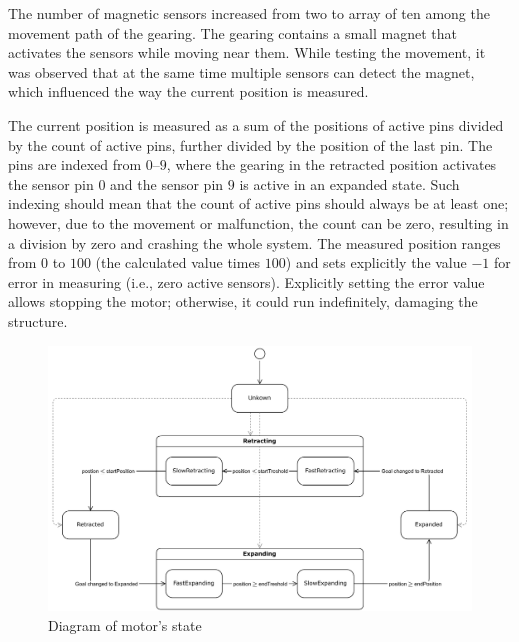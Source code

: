 \documentclass[
  digital,     %
  oneside,     %
  nosansbold,  %
  nocolorbold, %
  nolof,         %
  nolot,         %
]{fithesis4}
\begin{document}
The number of magnetic sensors increased from two to array of ten among the movement path of the
gearing. The gearing contains a small magnet that activates the sensors while moving near them.
While testing the movement, it was observed that at the same time multiple sensors can detect the
magnet, which influenced the way the current position is measured.

The current position is measured as a sum of the positions of active pins divided by the count of
active pins, further divided by the position of the last pin. The pins are indexed from
$\numrange{0}{9}$, where the gearing in the retracted position activates the sensor pin $0$ and the
sensor pin $9$ is active in an expanded state. Such indexing should mean that the count of active
pins should always be at least one; however, due to the movement or malfunction, the count can be
zero, resulting in a division by zero and crashing the whole system. The measured position ranges
from $0$ to $100$ (the calculated value times $100$) and sets explicitly the value $-1$ for error in
measuring (i.e., zero active sensors). Explicitly setting the error value allows stopping the motor;
otherwise, it could run indefinitely, damaging the structure. 

\begin{figure}
    \includegraphics[width=\textwidth,height=\textheight,keepaspectratio]{assets/motor-state.pdf}
    \caption{Diagram of motor's state}
    \label{fig:motor-state}
\end{figure}
\end{document}
